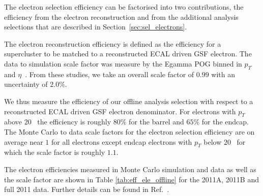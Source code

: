 
The electron selection efficiency can be factorised into two contributions,
the efficiency from the electron reconstruction and from the additional
analysis selections that are described in Section~\ref{sec:sel_electrons}.

The electron reconstruction efficiency is defined as the efficiency for a
supercluster to be matched to a reconstructed ECAL driven GSF electron.
The data to simulation scale factor was measure by the Egamma POG binned in
$p_T$ and $\eta$~\cite{ref:egamma_eff_gsf}. From these studies, we take an overall scale factor of
$0.99$ with an uncertainty of $2.0\%$.

We thus measure the efficiency of our offline analysis selection 
with respect to a reconstructed ECAL driven GSF electron denominator. 
For electrons with $p_{T}$ 
above $20$ \GeV\, the efficiency is roughly $80\%$ for the barrel and 
$65\%$ for the endcap.
The Monte Carlo to data scale factors for the electron selection efficiency are
on average near $1$ for all electrons except endcap electrons with $p_{T}$ 
below $20$ \GeV\ for which the scale factor is roughly $1.1$. 

The electron efficiencies measured in Monte Carlo simulation and data as well as the scale
factor are shown in Table \ref{tab:eff_ele_offline} for the 2011A, 2011B and full 2011 data.
Further details can be found in Ref.~\cite{HWW2011Final}.

